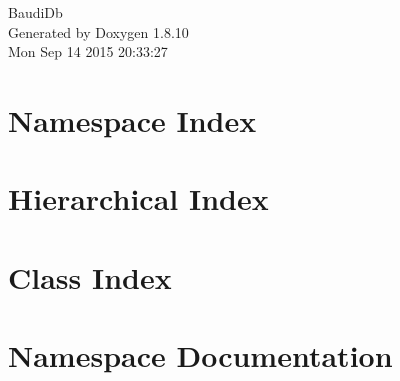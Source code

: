 \documentclass[twoside]{book}
\newcommand{\+}{\discretionary{\mbox{\scriptsize$\hookleftarrow$}}{}{}}
\newcommand{\clearemptydoublepage}{%
  \newpage{\pagestyle{empty}\cleardoublepage}%
}
\begin{document}
\hypersetup{pageanchor=false,
             bookmarks=true,
             bookmarksnumbered=true,
             pdfencoding=unicode
            }
\begin{titlepage}
\vspace*{7cm}
\begin{center}%
{\Large Baudi\+Db }\\
\vspace*{1cm}
{\large Generated by Doxygen 1.8.10}\\
\vspace*{0.5cm}
{\small Mon Sep 14 2015 20:33:27}\\
\end{center}
\end{titlepage}
\clearemptydoublepage
\tableofcontents
\clearemptydoublepage
{}
\hypersetup{pageanchor=true}

\chapter{Namespace Index}

\chapter{Hierarchical Index}

\chapter{Class Index}

\chapter{Namespace Documentation}























\end{document}
